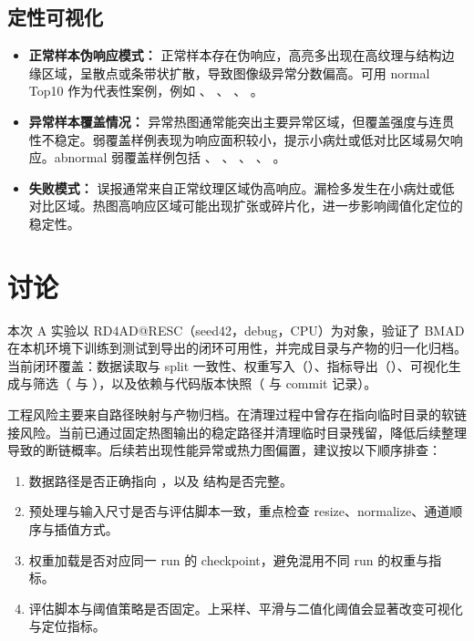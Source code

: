 \documentclass[a4paper,11pt,UTF8]{ctexart}
\begin{document}
\subsection{定性可视化}
\begin{itemize}
  \item \textbf{正常样本伪响应模式：}
  正常样本存在伪响应，高亮多出现在高纹理与结构边缘区域，呈散点或条带状扩散，导致图像级异常分数偏高。可用 normal Top10 作为代表性案例，例如
  、
  、
  、
  。

  \item \textbf{异常样本覆盖情况：}
  异常热图通常能突出主要异常区域，但覆盖强度与连贯性不稳定。弱覆盖样例表现为响应面积较小，提示小病灶或低对比区域易欠响应。abnormal 弱覆盖样例包括
  、
  、
  、
  、
  。

  \item \textbf{失败模式：}
  误报通常来自正常纹理区域伪高响应。漏检多发生在小病灶或低对比区域。热图高响应区域可能出现扩张或碎片化，进一步影响阈值化定位的稳定性。
\end{itemize}

\section{讨论}
本次 A 实验以 RD4AD@RESC（seed42，debug，CPU）为对象，验证了 BMAD 在本机环境下训练到测试到导出的闭环可用性，并完成目录与产物的归一化归档。当前闭环覆盖：数据读取与 split 一致性、权重写入（）、指标导出（）、可视化生成与筛选（ 与 ），以及依赖与代码版本快照（ 与 commit 记录）。

工程风险主要来自路径映射与产物归档。在清理过程中曾存在指向临时目录的软链接风险。当前已通过固定热图输出的稳定路径并清理临时目录残留，降低后续整理导致的断链概率。后续若出现性能异常或热力图偏置，建议按以下顺序排查：
\begin{enumerate}
  \item 数据路径是否正确指向 ，以及  结构是否完整。
  \item 预处理与输入尺寸是否与评估脚本一致，重点检查 resize、normalize、通道顺序与插值方式。
  \item 权重加载是否对应同一 run 的 checkpoint，避免混用不同 run 的权重与指标。
  \item 评估脚本与阈值策略是否固定。上采样、平滑与二值化阈值会显著改变可视化与定位指标。
\end{enumerate}
\end{document}
